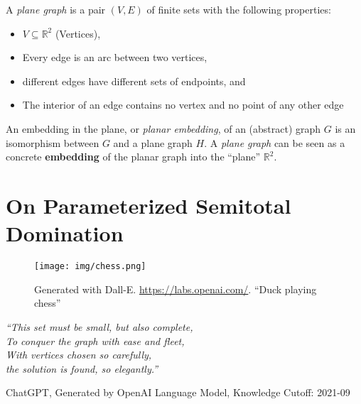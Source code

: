 \begin{graphclass}[Planar]

A \textit{plane graph} is a pair $(V,E)$ of finite sets with the following properties:

\begin{itemize}
    \item $V \subseteq \mathbb{R}^2$ (Vertices),
    \vspace{-2mm}
    \item Every edge is an arc between two vertices, 
    \vspace{-2mm}
    \item different edges have different sets of endpoints, and
    \vspace{-2mm}
    \item The interior of an edge contains no vertex and no point of any other edge
\end{itemize}

An embedding in the plane, or \textit{planar embedding}, of an (abstract) graph $G$ is an isomorphism between $G$ and a plane graph $H$. A \textit{plane graph} can be seen as a concrete \textbf{embedding} of the planar graph into the ``plane'' $\mathbb{R}^2$.

\end{graphclass}



\chapter{On Parameterized Semitotal Domination}\label{ch:semitotal-domination}

\vspace*{-50pt}

\begin{figure}[ht]
        \texttt{[image: img/chess.png]}
        \captionsetup{textformat=empty,labelformat=blank}
        \caption{Generated with Dall-E. \url{https://labs.openai.com/}. ``Duck playing chess''}
\end{figure}

\epigraph{\itshape ``This set must be small, but also complete, \\ 
To conquer the
graph with ease and fleet, \\
With vertices chosen so carefully, \\
the solution is found, so elegantly.''
}{ChatGPT, Generated by OpenAI Language Model, Knowledge Cutoff: 2021-09}


